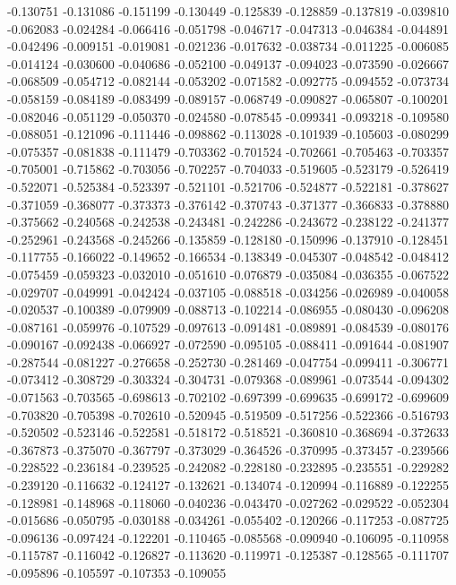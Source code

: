 -0.130751
-0.131086
-0.151199
-0.130449
-0.125839
-0.128859
-0.137819
-0.039810
-0.062083
-0.024284
-0.066416
-0.051798
-0.046717
-0.047313
-0.046384
-0.044891
-0.042496
-0.009151
-0.019081
-0.021236
-0.017632
-0.038734
-0.011225
-0.006085
-0.014124
-0.030600
-0.040686
-0.052100
-0.049137
-0.094023
-0.073590
-0.026667
-0.068509
-0.054712
-0.082144
-0.053202
-0.071582
-0.092775
-0.094552
-0.073734
-0.058159
-0.084189
-0.083499
-0.089157
-0.068749
-0.090827
-0.065807
-0.100201
-0.082046
-0.051129
-0.050370
-0.024580
-0.078545
-0.099341
-0.093218
-0.109580
-0.088051
-0.121096
-0.111446
-0.098862
-0.113028
-0.101939
-0.105603
-0.080299
-0.075357
-0.081838
-0.111479
-0.703362
-0.701524
-0.702661
-0.705463
-0.703357
-0.705001
-0.715862
-0.703056
-0.702257
-0.704033
-0.519605
-0.523179
-0.526419
-0.522071
-0.525384
-0.523397
-0.521101
-0.521706
-0.524877
-0.522181
-0.378627
-0.371059
-0.368077
-0.373373
-0.376142
-0.370743
-0.371377
-0.366833
-0.378880
-0.375662
-0.240568
-0.242538
-0.243481
-0.242286
-0.243672
-0.238122
-0.241377
-0.252961
-0.243568
-0.245266
-0.135859
-0.128180
-0.150996
-0.137910
-0.128451
-0.117755
-0.166022
-0.149652
-0.166534
-0.138349
-0.045307
-0.048542
-0.048412
-0.075459
-0.059323
-0.032010
-0.051610
-0.076879
-0.035084
-0.036355
-0.067522
-0.029707
-0.049991
-0.042424
-0.037105
-0.088518
-0.034256
-0.026989
-0.040058
-0.020537
-0.100389
-0.079909
-0.088713
-0.102214
-0.086955
-0.080430
-0.096208
-0.087161
-0.059976
-0.107529
-0.097613
-0.091481
-0.089891
-0.084539
-0.080176
-0.090167
-0.092438
-0.066927
-0.072590
-0.095105
-0.088411
-0.091644
-0.081907
-0.287544
-0.081227
-0.276658
-0.252730
-0.281469
-0.047754
-0.099411
-0.306771
-0.073412
-0.308729
-0.303324
-0.304731
-0.079368
-0.089961
-0.073544
-0.094302
-0.071563
-0.703565
-0.698613
-0.702102
-0.697399
-0.699635
-0.699172
-0.699609
-0.703820
-0.705398
-0.702610
-0.520945
-0.519509
-0.517256
-0.522366
-0.516793
-0.520502
-0.523146
-0.522581
-0.518172
-0.518521
-0.360810
-0.368694
-0.372633
-0.367873
-0.375070
-0.367797
-0.373029
-0.364526
-0.370995
-0.373457
-0.239566
-0.228522
-0.236184
-0.239525
-0.242082
-0.228180
-0.232895
-0.235551
-0.229282
-0.239120
-0.116632
-0.124127
-0.132621
-0.134074
-0.120994
-0.116889
-0.122255
-0.128981
-0.148968
-0.118060
-0.040236
-0.043470
-0.027262
-0.029522
-0.052304
-0.015686
-0.050795
-0.030188
-0.034261
-0.055402
-0.120266
-0.117253
-0.087725
-0.096136
-0.097424
-0.122201
-0.110465
-0.085568
-0.090940
-0.106095
-0.110958
-0.115787
-0.116042
-0.126827
-0.113620
-0.119971
-0.125387
-0.128565
-0.111707
-0.095896
-0.105597
-0.107353
-0.109055
